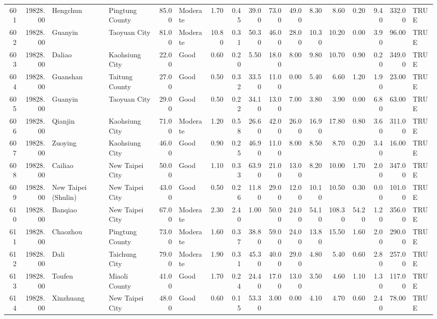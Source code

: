 \begin{table}[ht]
\begin{tabular}{rrllrlrrrrrrrrrrl}
  601 & 19828.00 & Hengchun & Pingtung County & 85.00 & Moderate & 1.70 & 0.45 & 39.00 & 73.00 & 49.00 & 8.30 & 8.60 & 0.20 & 9.40 & 332.00 & TRUE \\ 
  602 & 19828.00 & Guanyin & Taoyuan City & 81.00 & Moderate & 10.80 & 0.31 & 50.30 & 46.00 & 28.00 & 10.30 & 10.20 & 0.00 & 3.90 & 96.00 & TRUE \\ 
  603 & 19828.00 & Daliao & Kaohsiung City & 22.00 & Good & 0.60 & 0.20 & 5.50 & 18.00 & 8.00 & 9.80 & 10.70 & 0.90 & 0.20 & 349.00 & TRUE \\ 
  604 & 19828.00 & Guanshan & Taitung County & 27.00 & Good & 0.50 & 0.32 & 33.50 & 11.00 & 0.00 & 5.40 & 6.60 & 1.20 & 1.90 & 23.00 & TRUE \\ 
  605 & 19828.00 & Guanyin & Taoyuan City & 29.00 & Good & 0.50 & 0.22 & 34.10 & 13.00 & 7.00 & 3.80 & 3.90 & 0.00 & 6.80 & 63.00 & TRUE \\ 
  606 & 19828.00 & Qianjin & Kaohsiung City & 71.00 & Moderate & 1.20 & 0.58 & 26.60 & 42.00 & 26.00 & 16.90 & 17.80 & 0.80 & 3.60 & 311.00 & TRUE \\ 
  607 & 19828.00 & Zuoying & Kaohsiung City & 46.00 & Good & 0.90 & 0.25 & 46.90 & 11.00 & 8.00 & 8.50 & 8.70 & 0.20 & 3.40 & 16.00 & TRUE \\ 
  608 & 19828.00 & Cailiao & New Taipei City & 50.00 & Good & 1.10 & 0.33 & 63.90 & 21.00 & 13.00 & 8.20 & 10.00 & 1.70 & 2.00 & 347.00 & TRUE \\ 
  609 & 19828.00 & New Taipei (Shulin) & New Taipei City & 43.00 & Good & 0.50 & 0.26 & 11.80 & 29.00 & 12.00 & 10.10 & 10.50 & 0.30 & 0.00 & 101.00 & TRUE \\ 
  610 & 19828.00 & Banqiao & New Taipei City & 67.00 & Moderate & 2.30 & 2.40 & 1.00 & 50.00 & 24.00 & 54.10 & 108.30 & 54.20 & 1.20 & 356.00 & TRUE \\ 
  611 & 19828.00 & Chaozhou & Pingtung County & 73.00 & Moderate & 1.60 & 0.37 & 38.80 & 59.00 & 24.00 & 13.80 & 15.50 & 1.60 & 2.00 & 290.00 & TRUE \\ 
  612 & 19828.00 & Dali & Taichung City & 79.00 & Moderate & 1.90 & 0.31 & 45.30 & 40.00 & 29.00 & 4.80 & 5.40 & 0.60 & 2.80 & 257.00 & TRUE \\ 
  613 & 19828.00 & Toufen & Miaoli County & 41.00 & Good & 1.70 & 0.24 & 24.40 & 17.00 & 13.00 & 3.50 & 4.60 & 1.10 & 1.30 & 117.00 & TRUE \\ 
  614 & 19828.00 & Xinzhuang & New Taipei City & 48.00 & Good & 0.60 & 0.15 & 53.30 & 3.00 & 0.00 & 4.10 & 4.70 & 0.60 & 2.40 & 78.00 & TRUE \\ 

\end{tabular}
\end{table}
